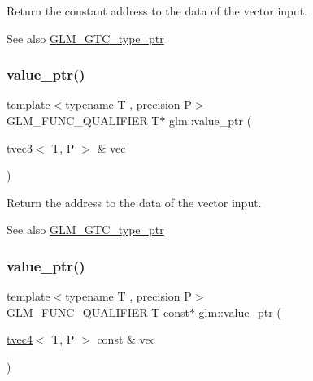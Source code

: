 Return the constant address to the data of the vector input. \begin{DoxySeeAlso}{See also}
\hyperlink{group__gtc__type__ptr}{G\+L\+M\+\_\+\+G\+T\+C\+\_\+type\+\_\+ptr} 
\end{DoxySeeAlso}
\mbox{\label{group__gtc__type__ptr_gab2832ef9f1d2571fab5c7ae661e11e75}} 
\subsubsection{\texorpdfstring{value\+\_\+ptr()}{value\_ptr()}\hspace{0.1cm}{\footnotesize\ttfamily [4/27]}}
{\footnotesize\ttfamily template$<$typename T , precision P$>$ \\
G\+L\+M\+\_\+\+F\+U\+N\+C\+\_\+\+Q\+U\+A\+L\+I\+F\+I\+ER T$\ast$ glm\+::value\+\_\+ptr (\begin{DoxyParamCaption}\item[{\hyperlink{structglm_1_1tvec3}{tvec3}$<$ T, P $>$ \&}]{vec }\end{DoxyParamCaption})}

Return the address to the data of the vector input. \begin{DoxySeeAlso}{See also}
\hyperlink{group__gtc__type__ptr}{G\+L\+M\+\_\+\+G\+T\+C\+\_\+type\+\_\+ptr} 
\end{DoxySeeAlso}
\mbox{\label{group__gtc__type__ptr_gaf641bc0e28d4b274826b9afed315d310}} 
\subsubsection{\texorpdfstring{value\+\_\+ptr()}{value\_ptr()}\hspace{0.1cm}{\footnotesize\ttfamily [5/27]}}
{\footnotesize\ttfamily template$<$typename T , precision P$>$ \\
G\+L\+M\+\_\+\+F\+U\+N\+C\+\_\+\+Q\+U\+A\+L\+I\+F\+I\+ER T const$\ast$ glm\+::value\+\_\+ptr (\begin{DoxyParamCaption}\item[{\hyperlink{structglm_1_1tvec4}{tvec4}$<$ T, P $>$ const \&}]{vec }\end{DoxyParamCaption})}

